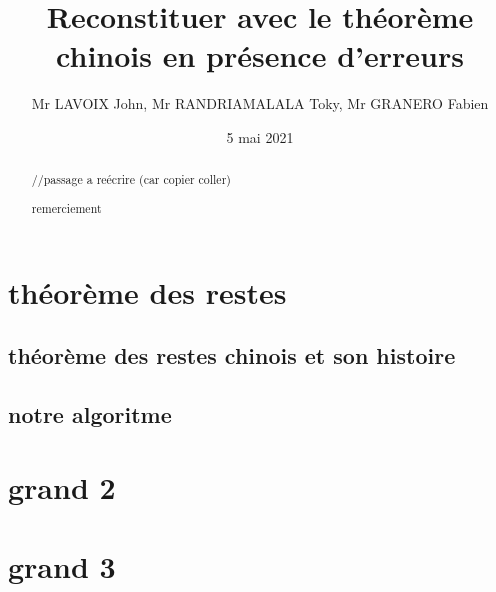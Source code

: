 \documentclass[a4paper, 11pt]{article}
\begin{document}
\title{Reconstituer avec le théorème chinois en présence d’erreurs}
\author{Mr LAVOIX John, Mr RANDRIAMALALA Toky, Mr GRANERO Fabien }
\date{5 mai 2021}



\begin{abstract}

//passage a reécrire (car copier coller) 
\end{abstract}

\newpage

\tableofcontents

\newpage
\begin{abstract}
    remerciement
\end{abstract}

\newpage
\section{théorème des restes}
\subsection{théorème des restes chinois et son histoire}
\subsection{notre algoritme}

\newpage
\section{grand 2}

\newpage
\section{grand 3}
\end{document}
